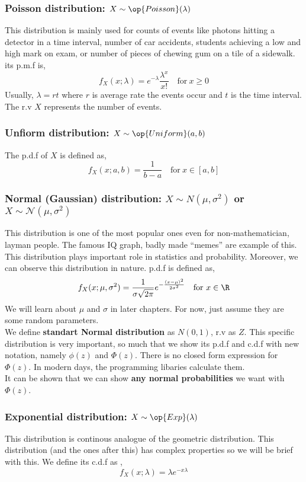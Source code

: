 \subsubsection*{Poisson distribution: $X \sim \op{Poisson}(\lambda)$}
This distribution is mainly used for counts of events like photons hitting a detector in a time interval, number of car accidents, students
achieving a low and high mark on exam, or number of pieces of chewing gum on a tile of a sidewalk. its p.m.f is,
\[f_X(x; \lambda) = e^{-\lambda} \frac{\lambda^{x}}{x!} \quad \text{for} \ x \ge 0 \]
Usually, $\lambda = rt$ where $r$ is average rate the events occur and $t$ is the time interval. The r.v $X$ represents the number of events.
\subsubsection*{Unfiorm distribution: $X \sim \op{Uniform}(a,b)$}
The p.d.f of $X$ is defined as,
\[f_X(x; a,b)= \frac{1}{b-a} \quad \text{for} \ x \in [a,b]\]
\subsubsection*{Normal (Gaussian) distribution: $X \sim N(\mu, \sigma^2)$ or $X \sim \mathcal{N}(\mu, \sigma^2)$}
This distribution is one of the most popular ones even for non-mathematician, layman people. The famous IQ graph, badly made ``memes'' are
example of this. This distribution plays important role in statistics and probability. Moreover, we can observe this distribution in
nature. p.d.f is defined as,
\[f_X(x; \mu, \sigma^2) = \frac{1}{\sigma \sqrt{2 \pi}}  e^{- \frac{(x- \mu)^2}{2\sigma^2}} \quad \text{for} \ x \in \R \]
We will learn about $\mu$ and $\sigma$ in later chapters. For now, just assume they are some random parameters. \\
We define  \textbf{standart Normal distribution} as $N(0,1)$, r.v as $Z$. This specific distribution is very important, so much that we
show its p.d.f and c.d.f with new notation, namely $\phi(z)$ and $\Phi(z)$. There is no closed form expression for $\Phi(z)$. In modern
days, the programming libaries calculate them. \\
It can be shown that we can show \textbf{any normal  probabilities} we want with $\Phi(z)$.
\subsubsection*{Exponential distribution: $X \sim \op{Exp}(\lambda)$}
This distribution is continous analogue of the geometric distribution. This distribution (and the ones after this) has complex properties
so we will be brief with this.
We define its c.d.f as ,
\[f_X(x; \lambda) = \lambda e^{-x \lambda}\]
